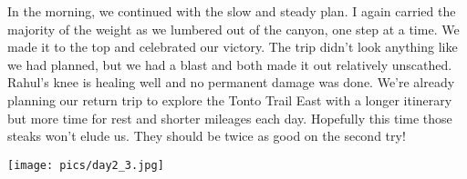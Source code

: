 \documentclass[10pt,a4paper]{article}
\newenvironment{Figure}
  {\par\medskip\noindent\minipage{\linewidth}}
  {\endminipage\par\medskip}
\begin{document}
\begin{multicols}{2}
In the morning, we continued with the slow and steady plan. I again carried the majority of the weight as we lumbered out of the canyon, one step at a time. We made it to the top and celebrated our victory. The trip didn't look anything like we had planned, but we had a blast and both made it out relatively unscathed. Rahul's knee is healing well and no permanent damage was done. We're already planning our return trip to explore the Tonto Trail East with a longer itinerary but more time for rest and shorter mileages each day. Hopefully this time those steaks won't elude us. They should be twice as good on the second try! 

\begin{Figure}
 \centering
 \texttt{[image: pics/day2\_3.jpg]}
\end{Figure}


\end{multicols}
\end{document}
